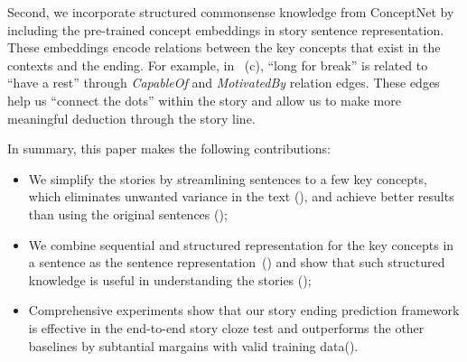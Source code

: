 Second, we incorporate structured commonsense knowledge 
from ConceptNet
by including the pre-trained concept 
embeddings in story sentence representation.  These embeddings encode
relations between the key concepts that exist in the contexts and the ending.
For example, in ~(c),  ``long for break'' is related to ``have a rest''
through {\em CapableOf} and {\em MotivatedBy} relation edges.
These edges help us ``connect the dots'' within the story and allow us
to make more meaningful deduction through the story line.

In summary, this paper makes the following contributions:
\begin{itemize}
\item We simplify the stories by streamlining sentences to a few
key concepts, which eliminates unwanted variance in the text (),
and achieve better results than
using the original sentences
();
\item We combine sequential and structured representation for the key concepts
in a sentence as the sentence representation~() 
and show that such structured
knowledge is useful in understanding the stories
();
\item Comprehensive experiments show that our story ending prediction
framework is effective in the end-to-end story cloze test and 
outperforms the other baselines by subtantial 
margains with valid training data().
\end{itemize}
